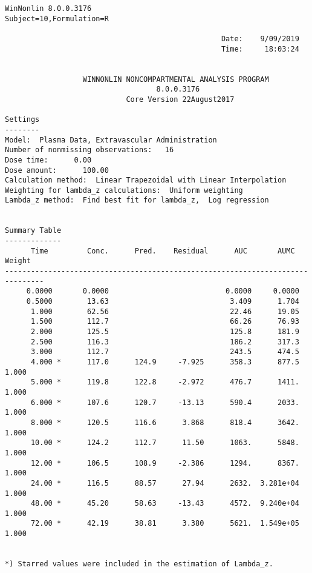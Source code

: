 \documentclass[12pt,a4paper]{article}
\begin{document}
\begin{verbatim}
WinNonlin 8.0.0.3176
Subject=10,Formulation=R

                                                  Date:    9/09/2019
                                                  Time:     18:03:24


                  WINNONLIN NONCOMPARTMENTAL ANALYSIS PROGRAM
                                   8.0.0.3176
                            Core Version 22August2017

Settings
--------
Model:  Plasma Data, Extravascular Administration
Number of nonmissing observations:   16
Dose time:      0.00
Dose amount:      100.00
Calculation method:  Linear Trapezoidal with Linear Interpolation
Weighting for lambda_z calculations:  Uniform weighting
Lambda_z method:  Find best fit for lambda_z,  Log regression


Summary Table
-------------
      Time         Conc.      Pred.    Residual      AUC       AUMC      Weight
-------------------------------------------------------------------------------
     0.0000       0.0000                           0.0000     0.0000
     0.5000        13.63                            3.409      1.704
      1.000        62.56                            22.46      19.05
      1.500        112.7                            66.26      76.93
      2.000        125.5                            125.8      181.9
      2.500        116.3                            186.2      317.3
      3.000        112.7                            243.5      474.5
      4.000 *      117.0      124.9     -7.925      358.3      877.5      1.000
      5.000 *      119.8      122.8     -2.972      476.7      1411.      1.000
      6.000 *      107.6      120.7     -13.13      590.4      2033.      1.000
      8.000 *      120.5      116.6      3.868      818.4      3642.      1.000
      10.00 *      124.2      112.7      11.50      1063.      5848.      1.000
      12.00 *      106.5      108.9     -2.386      1294.      8367.      1.000
      24.00 *      116.5      88.57      27.94      2632.  3.281e+04      1.000
      48.00 *      45.20      58.63     -13.43      4572.  9.240e+04      1.000
      72.00 *      42.19      38.81      3.380      5621.  1.549e+05      1.000


*) Starred values were included in the estimation of Lambda_z.



\end{verbatim}
\end{document}
